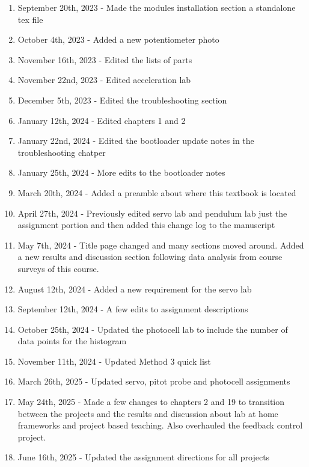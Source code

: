 \documentclass{article}
\begin{document}
\begin{enumerate}[itemsep=-5pt]
\item September 20th, 2023 - Made the modules installation section a standalone tex file
\item October 4th, 2023 - Added a new potentiometer photo
\item November 16th, 2023 - Edited the lists of parts 
\item November 22nd, 2023 - Edited acceleration lab
\item December 5th, 2023 - Edited the troubleshooting section
\item January 12th, 2024 - Edited chapters 1 and 2
\item January 22nd, 2024 - Edited the bootloader update notes in the troubleshooting chatper
\item January 25th, 2024 - More edits to the bootloader notes
\item March 20th, 2024 - Added a preamble about where this textbook is located
\item April 27th, 2024 - Previously edited servo lab and pendulum lab just the assignment portion and then added this change log to the manuscript
\item May 7th, 2024 - Title page changed and many sections moved around. Added a new results and discussion section following data analysis from course surveys of this course.
\item August 12th, 2024 - Added a new requirement for the servo lab
\item September 12th, 2024 - A few edits to assignment descriptions
\item October 25th, 2024 - Updated the photocell lab to include the number of data points for the histogram
\item November 11th, 2024 - Updated Method 3 quick list
\item March 26th, 2025 - Updated servo, pitot probe and photocell assignments
\item May 24th, 2025 - Made a few changes to chapters 2 and 19 to transition between the projects and the results and discussion about lab at home frameworks and project based teaching. Also overhauled the feedback control project. 
\item June 16th, 2025 - Updated the assignment directions for all projects 
\end{enumerate}

\newpage

\tableofcontents

\newpage













\end{document}
